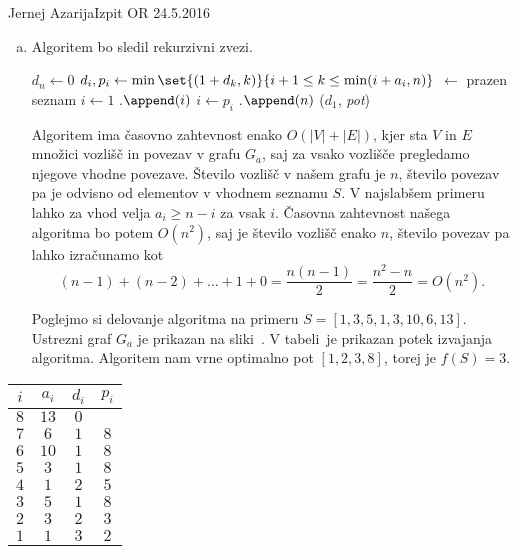 \begin{naloga}{Jernej Azarija}{Izpit OR 24.5.2016}
\begin{odgovor}
\begin{enumerate}[(a)]
\item Algoritem bo sledil rekurzivni zvezi.

\begin{small}
\begin{algorithmic}
	\State $d_n \gets 0$
		\State $d_i, p_i \gets
            \min\set{(1+d_k, k)}{i+1 \le k \le \min(i+a_i, n)}$
	\EndFor
	 $\gets$ prazen seznam
	\State $i \gets 1$
		.$\append(i)$
		\State $i \gets p_i$
	\EndWhile
    .$\append(n)$
	\State \Return ($d_1$, {\sl pot})
\EndFunction
\end{algorithmic}
\end{small}

Algoritem ima časovno zahtevnost enako $O(|V| + |E|)$,
kjer sta $V$ in $E$ množici vozlišč in povezav v grafu $G_a$,
saj za vsako vozlišče pregledamo njegove vhod\-ne povezave.
Število vozlišč v našem grafu je $n$, število povezav pa je odvisno od elementov v vhodnem seznamu $S$.
V najslabšem primeru lahko za vhod velja $a_i \ge n-i$ za vsak $i$.
Časovna zahtevnost našega algoritma bo potem $O(n^2)$,
saj je število vozlišč enako $n$,
število povezav pa lahko izračunamo kot
$$
(n - 1) + (n - 2) + \dots + 1 + 0 = \frac{n (n - 1)}{2}
= \frac{n ^2 - n}{2} = O(n^2) .
$$

Poglejmo si delovanje algoritma na primeru $S = [1,3,5,1,3,10,6,13]$.
Ustrezni graf $G_a$ je prikazan na sliki~\fig.
V tabeli~\tab je prikazan potek izvajanja algoritma.
Algoritem nam vrne optimalno pot $[1, 2, 3, 8]$, torej je $f(S) = 3$.
\end{enumerate}

\begin{slika}
\pgfslika
{}
\end{slika}

\begin{tabela}
\begin{tabular}{cc|cc}
$i$ & $a_i$ & $d_i$ & $p_i$ \\ \hline
$8$ & $13$ & $0$       \\
$7$ & $6$  & $1$ & $8$ \\
$6$ & $10$ & $1$ & $8$ \\
$5$ & $3$  & $1$ & $8$ \\
$4$ & $1$  & $2$ & $5$ \\
$3$ & $5$  & $1$ & $8$ \\
$2$ & $3$  & $2$ & $3$ \\
$1$ & $1$  & $3$ & $2$
\end{tabular}
\end{tabela}

\end{odgovor}
\end{naloga}
